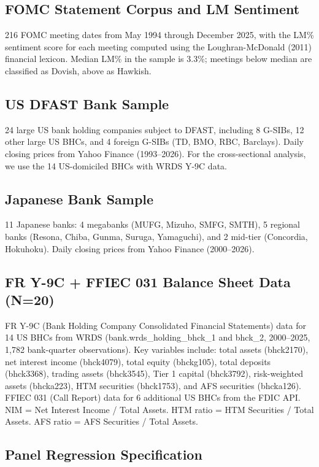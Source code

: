 \documentclass[12pt,a4paper]{article}
\begin{document}
\subsection{FOMC Statement Corpus and LM Sentiment}

216 FOMC meeting dates from May 1994 through December 2025, with the LM\% sentiment score for each meeting computed using the Loughran-McDonald (2011) financial lexicon. Median LM\% in the sample is 3.3\%; meetings below median are classified as Dovish, above as Hawkish.

\subsection{US DFAST Bank Sample}

24 large US bank holding companies subject to DFAST, including 8 G-SIBs, 12 other large US BHCs, and 4 foreign G-SIBs (TD, BMO, RBC, Barclays). Daily closing prices from Yahoo Finance (1993–2026). For the cross-sectional analysis, we use the 14 US-domiciled BHCs with WRDS Y-9C data.

\subsection{Japanese Bank Sample}

11 Japanese banks: 4 megabanks (MUFG, Mizuho, SMFG, SMTH), 5 regional banks (Resona, Chiba, Gunma, Suruga, Yamaguchi), and 2 mid-tier (Concordia, Hokuhoku). Daily closing prices from Yahoo Finance (2000–2026).

\subsection{FR Y-9C + FFIEC 031 Balance Sheet Data (N=20)}

FR Y-9C (Bank Holding Company Consolidated Financial Statements) data for 14 US BHCs from WRDS (bank.wrds\_holding\_bhck\_1 and bhck\_2, 2000–2025, 1,782 bank-quarter observations). Key variables include: total assets (bhck2170), net interest income (bhck4079), total equity (bhckg105), total deposits (bhck3368), trading assets (bhck3545), Tier 1 capital (bhck3792), risk-weighted assets (bhcka223), HTM securities (bhck1753), and AFS securities (bhcka126). FFIEC 031 (Call Report) data for 6 additional US BHCs from the FDIC API. NIM = Net Interest Income / Total Assets. HTM ratio = HTM Securities / Total Assets. AFS ratio = AFS Securities / Total Assets.

\subsection{Panel Regression Specification}
\end{document}
